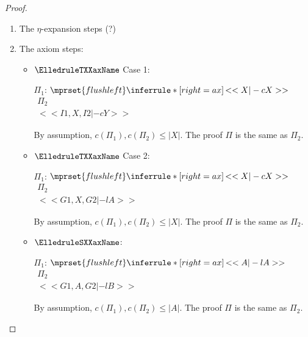 \begin{proof}
\begin{enumerate}
  \item The $\eta$-expansion steps (?)
  \item The axiom steps:
    \begin{itemize}
    \item $\ElledruleTXXaxName$ Case 1:
      \begin{center}
        \scriptsize
        $\Pi_1$:
        \begin{math}
          $$\mprset{flushleft}
          \inferrule* [right={\tiny ax}] {
            \,
          }{<<X |-c X>>}
        \end{math}
        \qquad\qquad
        \begin{math}
          \begin{array}{c}
            \Pi_2 \\
            {<<I1, X, I2 |-c Y>>}
          \end{array}
        \end{math}
      \end{center}
      By assumption, $c(\Pi_1),c(\Pi_2)\leq |X|$. The proof $\Pi$ is the same as $\Pi_2$.

    \item $\ElledruleTXXaxName$ Case 2:
      \begin{center}
        \scriptsize
        $\Pi_1$:
        \begin{math}
          $$\mprset{flushleft}
          \inferrule* [right={\tiny ax}] {
            \,
          }{<<X |-c X>>}
        \end{math}
        \qquad\qquad
        \begin{math}
          \begin{array}{c}
            \Pi_2 \\
            {<<G1, X, G2 |-l A>>}
          \end{array}
        \end{math}
      \end{center}
      By assumption, $c(\Pi_1),c(\Pi_2)\leq |X|$. The proof $\Pi$ is the same as $\Pi_2$.

    \item $\ElledruleSXXaxName$:
      \begin{center}
        \scriptsize
        $\Pi_1$:
        \begin{math}
          $$\mprset{flushleft}
          \inferrule* [right={\tiny ax}] {
            \,
          }{<<A |-l A>>}
        \end{math}
        \qquad\qquad
        \begin{math}
          \begin{array}{c}
            \Pi_2 \\
            {<<G1, A, G2 |-l B>>}
          \end{array}
        \end{math}
      \end{center}
      By assumption, $c(\Pi_1),c(\Pi_2)\leq |A|$. The proof $\Pi$ is the same as $\Pi_2$.


\end{itemize}
\end{enumerate}
\end{proof}
